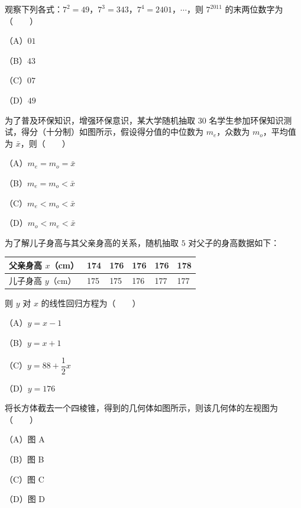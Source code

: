 \begin{question}
观察下列各式：$7^2=49$，$7^3=343$，$7^4=2401$，$\cdots$，则 $7^{2011}$ 的末两位数字为\mbox{（　　）}

（A）$01$

（B）$43$

（C）$07$

（D）$49$

\Needspace{0.4\textheight}
\end{question}
\begin{question}
为了普及环保知识，增强环保意识，某大学随机抽取 $30$ 名学生参加环保知识测试，得分（十分制）如图所示，假设得分值的中位数为 $m_e$，众数为 $m_o$，平均值为 $\bar x$，则\mbox{（　　）}

（A）$m_e=m_o=\bar x$

（B）$m_e=m_o<\bar x$

（C）$m_e<m_o<\bar x$

（D）$m_o<m_e<\bar x$
\nopagebreak[4]
\begin{center}\end{center}
\nopagebreak[4]
\end{question}
\begin{question}
为了解儿子身高与其父亲身高的关系，随机抽取 $5$ 对父子的身高数据如下：

\begin{center}
\begin{tabular}{llllll}
\toprule
父亲身高 $x$（cm） & 174 & 176 & 176 & 176 & 178 \\
\midrule
儿子身高 $y$（cm） & 175 & 175 & 176 & 177 & 177 \\
\bottomrule
\end{tabular}
\end{center}

则 $y$ 对 $x$ 的线性回归方程为\mbox{（　　）}

（A）$y=x-1$

（B）$y=x+1$

（C）$y=88+\dfrac12x$

（D）$y=176$

\Needspace{0.4\textheight}
\end{question}
\begin{question}
将长方体截去一个四棱锥，得到的几何体如图所示，则该几何体的左视图为\mbox{（　　）}

（A）图 A

（B）图 B

（C）图 C

（D）图 D
\nopagebreak[4]
\begin{center}\end{center}
\nopagebreak[4]
\Needspace{0.4\textheight}
\end{question}
